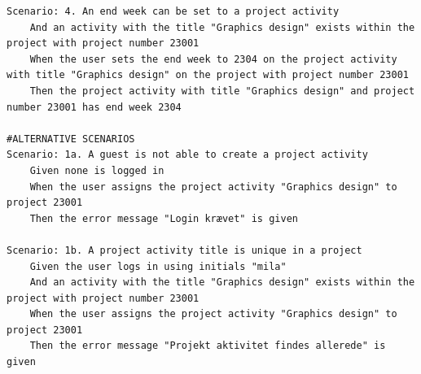 \begin{listing}[H]
\begin{verbatim}
Scenario: 4. An end week can be set to a project activity
    And an activity with the title "Graphics design" exists within the project with project number 23001
    When the user sets the end week to 2304 on the project activity with title "Graphics design" on the project with project number 23001
    Then the project activity with title "Graphics design" and project number 23001 has end week 2304

#ALTERNATIVE SCENARIOS
Scenario: 1a. A guest is not able to create a project activity
    Given none is logged in
    When the user assigns the project activity "Graphics design" to project 23001
    Then the error message "Login krævet" is given

Scenario: 1b. A project activity title is unique in a project
    Given the user logs in using initials "mila"
    And an activity with the title "Graphics design" exists within the project with project number 23001
    When the user assigns the project activity "Graphics design" to project 23001
    Then the error message "Projekt aktivitet findes allerede" is given
    \end{verbatim}
\end{listing}
